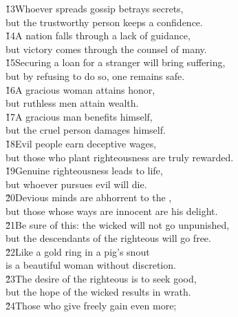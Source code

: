 \begin{poetry}
\poeml \v{13}Whoever spreads gossip betrays secrets, \\
\poemll    but the trustworthy person keeps a confidence. \\
\poeml \v{14}A nation falls through a lack of guidance, \\
\poemll    but victory comes through the counsel of many. \\
\poeml \v{15}Securing a loan for a stranger will bring suffering, \\
\poemll    but by refusing to do so, one remains safe. \\
\poeml \v{16}A gracious woman attains honor, \\
\poemll    but ruthless men attain wealth. \\
\poeml \v{17}A gracious man benefits himself, \\
\poemll    but the cruel person damages himself. \\
\poeml \v{18}Evil people earn deceptive wages, \\
\poemll    but those who plant righteousness are truly rewarded. \\
\poeml \v{19}Genuine righteousness leads to life, \\
\poemll    but whoever pursues evil will die. \\
\poeml \v{20}Devious minds are abhorrent to the , \\
\poemll    but those whose ways are innocent are his delight. \\
\poeml \v{21}Be sure of this: the wicked will not go unpunished, \\
\poemll    but the descendants of the righteous will go free. \\
\poeml \v{22}Like a gold ring in a pig's snout \\
\poemll    is a beautiful woman without discretion. \\
\poeml \v{23}The desire of the righteous is to seek good, \\
\poemll    but the hope of the wicked results in wrath. \\
\poeml \v{24}Those who give freely gain even more; \\

\end{poetry}
